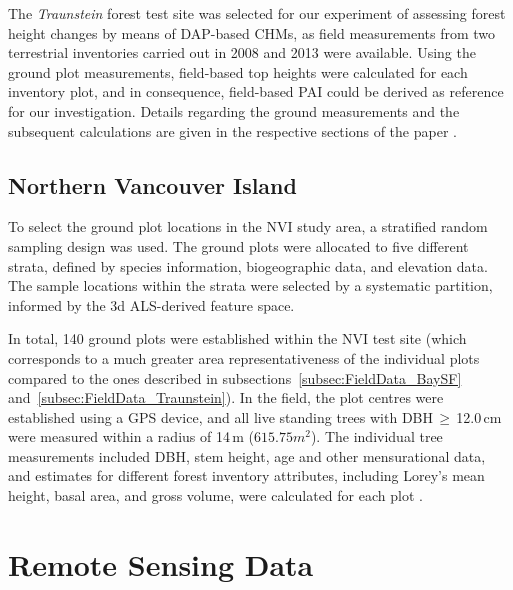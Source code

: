 The \emph{Traunstein} forest test site  was selected for our experiment of assessing forest height changes 
by means of \ac{DAP}-based \acp{CHM}, as field measurements from two terrestrial inventories carried out in 2008 and 2013 were available.
Using the ground plot measurements, field-based top heights were calculated for each inventory plot, and in consequence, field-based
\acf{PAI} could be derived as reference for our investigation. 
Details regarding the ground measurements and the subsequent calculations are given
in the respective sections of the paper \parencite{Stepper.2015}.


\subsection{Northern Vancouver Island}

To select 
the ground plot locations in the \ac{NVI} study area, a stratified random sampling design was used. 
The ground plots were allocated to five different strata, defined by species information, biogeographic data, and elevation data. 
The sample locations within the strata were selected by a systematic partition, informed by the 3d \ac{ALS}-derived feature space.

In total, 140 ground plots were established within the \ac{NVI} test site (which corresponds to a much greater area representativeness
of the individual plots compared to the ones described in subsections~\ref{subsec:FieldData_BaySF} and~\ref{subsec:FieldData_Traunstein}). 
In the field, the plot centres were established using a GPS device, and all live standing trees with \ac{DBH}\,$\geq$\,12.0\,cm were measured
within a radius of 14\,m ($615.75 m^2$). The individual tree measurements included \ac{DBH}, stem height, age and other mensurational data, 
and estimates for different forest inventory attributes, including Lorey's mean height, basal area, and gross volume, were calculated for each plot
\parencite{White.2015}.


\section{Remote Sensing Data}\label{sec:RemSensData}


